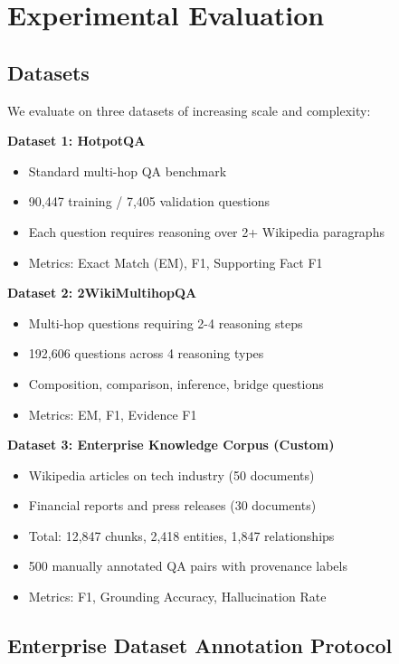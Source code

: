 \documentclass[conference]{IEEEtran}
\begin{document}
\section{Experimental Evaluation}

\subsection{Datasets}

We evaluate on three datasets of increasing scale and complexity:

\textbf{Dataset 1: HotpotQA} \cite{yang2018hotpotqa}
\begin{itemize}
    \item Standard multi-hop QA benchmark
    \item 90,447 training / 7,405 validation questions
    \item Each question requires reasoning over 2+ Wikipedia paragraphs
    \item Metrics: Exact Match (EM), F1, Supporting Fact F1
\end{itemize}

\textbf{Dataset 2: 2WikiMultihopQA} \cite{ho2020constructing}
\begin{itemize}
    \item Multi-hop questions requiring 2-4 reasoning steps
    \item 192,606 questions across 4 reasoning types
    \item Composition, comparison, inference, bridge questions
    \item Metrics: EM, F1, Evidence F1
\end{itemize}

\textbf{Dataset 3: Enterprise Knowledge Corpus (Custom)}
\begin{itemize}
    \item Wikipedia articles on tech industry (50 documents)
    \item Financial reports and press releases (30 documents)
    \item Total: 12,847 chunks, 2,418 entities, 1,847 relationships
    \item 500 manually annotated QA pairs with provenance labels
    \item Metrics: F1, Grounding Accuracy, Hallucination Rate
\end{itemize}

\subsection{Enterprise Dataset Annotation Protocol}
\end{document}
